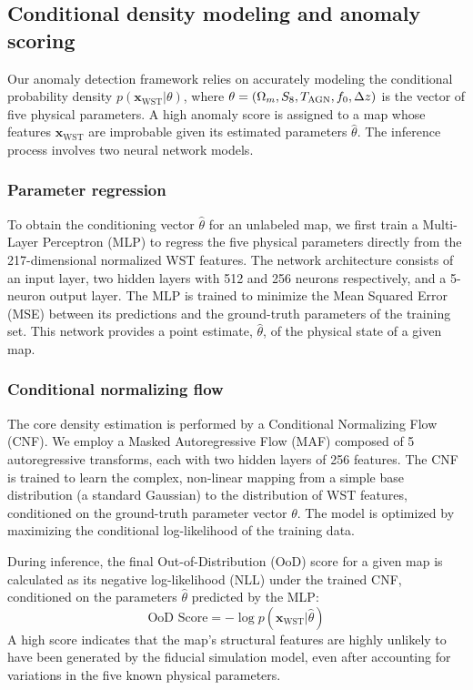 \documentclass[]{article}
\begin{document}
\subsection{Conditional density modeling and anomaly scoring}
Our anomaly detection framework relies on accurately modeling the conditional probability density $p(\mathbf{x}_{\text{WST}} | \theta)$, where $\theta = (\Omega_m, S_8, T_{\rm AGN}, f_0, \Delta z)$ is the vector of five physical parameters. A high anomaly score is assigned to a map whose features $\mathbf{x}_{\text{WST}}$ are improbable given its estimated parameters $\hat{\theta}$. The inference process involves two neural network models.

\subsubsection{Parameter regression}
To obtain the conditioning vector $\hat{\theta}$ for an unlabeled map, we first train a Multi-Layer Perceptron (MLP) to regress the five physical parameters directly from the 217-dimensional normalized WST features. The network architecture consists of an input layer, two hidden layers with 512 and 256 neurons respectively, and a 5-neuron output layer. The MLP is trained to minimize the Mean Squared Error (MSE) between its predictions and the ground-truth parameters of the training set. This network provides a point estimate, $\hat{\theta}$, of the physical state of a given map.

\subsubsection{Conditional normalizing flow}
The core density estimation is performed by a Conditional Normalizing Flow (CNF). We employ a Masked Autoregressive Flow (MAF) composed of 5 autoregressive transforms, each with two hidden layers of 256 features. The CNF is trained to learn the complex, non-linear mapping from a simple base distribution (a standard Gaussian) to the distribution of WST features, conditioned on the ground-truth parameter vector $\theta$. The model is optimized by maximizing the conditional log-likelihood of the training data.

During inference, the final Out-of-Distribution (OoD) score for a given map is calculated as its negative log-likelihood (NLL) under the trained CNF, conditioned on the parameters $\hat{\theta}$ predicted by the MLP:
\begin{equation}
    \text{OoD Score} = - \log p(\mathbf{x}_{\text{WST}} | \hat{\theta})
\end{equation}
A high score indicates that the map's structural features are highly unlikely to have been generated by the fiducial simulation model, even after accounting for variations in the five known physical parameters.
\end{document}
